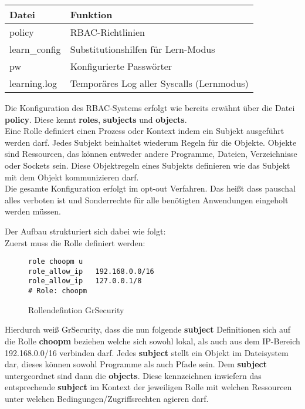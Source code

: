 \begin{tabular}{|ll|}
\hline
Datei & Funktion \\
\hline
policy & RBAC-Richtlinien \\
learn\_config & Substitutionshilfen für Lern-Modus \\
pw & Konfigurierte Passwörter \\
learning.log & Temporäres Log aller Syscalls (Lernmodus) \\
\hline
\end{tabular}

Die Konfiguration des RBAC-Systems erfolgt wie bereits erwähnt über die Datei \textbf{policy}. Diese kennt \textbf{roles}, \textbf{subjects} und \textbf{objects}.\\
Eine Rolle definiert einen Prozess oder Kontext indem ein Subjekt ausgeführt werden darf. Jedes Subjekt beinhaltet wiederum Regeln für die Objekte. Objekte sind Ressourcen, das können entweder andere Programme, Dateien, Verzeichnisse oder Sockets sein. Diese Objektregeln eines Subjekts definieren wie das Subjekt mit dem Objekt kommunizieren darf.\\
Die gesamte Konfiguration erfolgt im opt-out Verfahren. Das heißt dass pauschal alles verboten ist und Sonderrechte für alle benötigten Anwendungen eingeholt werden müssen.

\newpage
Der Aufbau strukturiert sich dabei wie folgt:\\
Zuerst muss die Rolle definiert werden:

\begin{figure}[h]
\label{lst:paxflagsan}
\begin{lstlisting}[numbers=none, frame=single, lineskip={-2.5pt}, breaklines=true]
role choopm u
role_allow_ip   192.168.0.0/16
role_allow_ip   127.0.0.1/8
# Role: choopm
\end{lstlisting}
\caption{Rollendefintion GrSecurity}
\end{figure}

Hierdurch weiß GrSecurity, dass die nun folgende \textbf{subject} Definitionen sich auf die Rolle \textbf{choopm} beziehen welche sich sowohl lokal, als auch aus dem IP-Bereich 192.168.0.0/16 verbinden darf. Jedes \textbf{subject} stellt ein Objekt im Dateisystem dar, dieses können sowohl Programme als auch Pfade sein. Dem \textbf{subject} untergeordnet sind dann die \textbf{objects}. Diese kennzeichnen inwiefern das entsprechende \textbf{subject} im Kontext der jeweiligen Rolle mit welchen Ressourcen unter welchen Bedingungen/Zugriffsrechten agieren darf.

